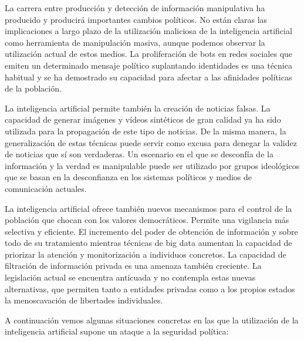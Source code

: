\documentclass[12pt,a4paper]{article}
\begin{document}
La carrera entre producción y detección de información manipulativa ha producido y producirá importantes cambios políticos. No están claras las implicaciones a largo plazo de la utilización maliciosa de la inteligencia artificial como herramienta de manipulación masiva, aunque podemos observar la utilización actual de estos medios. La proliferación de bots en redes sociales que emiten un determinado mensaje político suplantando identidades es una técnica habitual y se ha demostrado su capacidad para afectar a las afinidades políticas de la población.

La inteligencia artificial permite también la creación de noticias falsas. La capacidad de generar imágenes y vídeos sintéticos de gran calidad ya ha sido utilizada para la propagación de este tipo de noticias. De la misma manera, la generalización de estas técnicas puede servir como excusa para denegar la validez de noticias que sí son verdaderas. Un escenario en el que se desconfía de la información y la verdad es manipulable puede ser utilizado por grupos ideológicos que se basan en la desconfianza en los sistemas políticos y medios de comunicación actuales.

La inteligencia artificial ofrece también nuevos mecanismos para el control de la población que chocan con los valores democráticos. Permite una vigilancia más selectiva y eficiente. El incremento del poder de obtención de información y sobre todo de su tratamiento mientras técnicas de big data aumentan la capacidad de priorizar la atención y monitorización a individuos concretos. La capacidad de filtración de información privada es una amenaza también creciente. La legislación actual se encuentra anticuada y no contempla estas nuevas alternativas, que permiten tanto a entidades privadas como a los propios estados la menoscavación de libertades individuales.

A continuación vemos algunas situaciones concretas en las que la utilización de la inteligencia artificial supone un ataque a la seguridad política:
\end{document}
